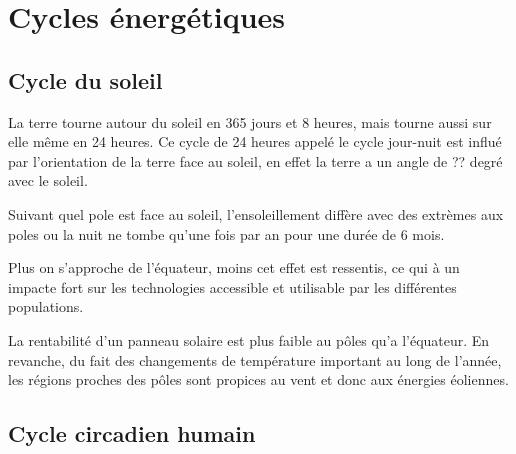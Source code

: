 \chapter{Cycles énergétiques}
\section{Cycle du soleil}

La terre tourne autour du soleil en 365 jours et 8 heures, mais tourne aussi sur elle même en 24 heures.
Ce cycle de 24 heures appelé le cycle jour-nuit est influé par l'orientation de la terre face au soleil,
en effet la terre a un angle de ?? degré avec le soleil.

Suivant quel pole est face au soleil, l'ensoleillement diffère avec des extrèmes aux poles ou la nuit ne tombe
qu'une fois par an pour une durée de 6 mois.

Plus on s'approche de l'équateur, moins cet effet est ressentis, ce qui à un impacte fort sur les technologies
accessible et utilisable par les différentes populations.

La rentabilité d'un panneau solaire est plus faible au pôles qu'a l'équateur.
En revanche, du fait des changements de température important au long de l'année, les régions proches des pôles
sont propices au vent et donc aux énergies éoliennes.



\section{Cycle circadien humain}



